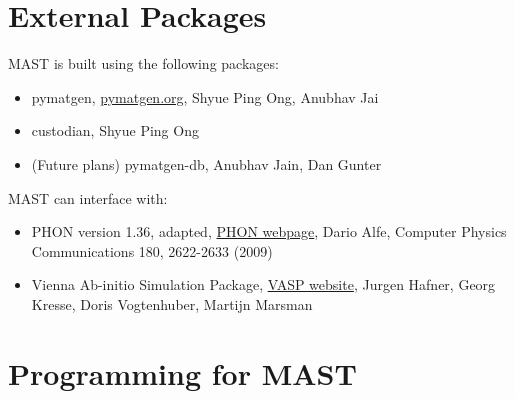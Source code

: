 \documentclass[letterpaper,10pt,english]{sphinxmanual}
\begin{document}
\chapter{External Packages}
\label{7_0_externalpackages:external-packages}\label{7_0_externalpackages::doc}
MAST is built using the following packages:
\begin{itemize}
\item {} 
pymatgen, \href{http://pymatgen.org}{pymatgen.org}, Shyue Ping Ong, Anubhav Jai

\item {} 
custodian, Shyue Ping Ong

\item {} 
(Future plans) pymatgen-db, Anubhav Jain, Dan Gunter

\end{itemize}

MAST can interface with:
\begin{itemize}
\item {} 
PHON version 1.36, adapted, \href{http://www.homepages.ucl.ac.uk/~ucfbdxa/phon/phon.html}{PHON webpage}, Dario Alfe, Computer Physics Communications 180, 2622-2633 (2009)

\item {} 
Vienna Ab-initio Simulation Package, \href{https://www.vasp.at/}{VASP website}, Jurgen Hafner, Georg Kresse, Doris Vogtenhuber, Martijn Marsman

\end{itemize}


\chapter{Programming for MAST}
\label{12_0_programming:programming-for-mast}\label{12_0_programming::doc}
\end{document}
